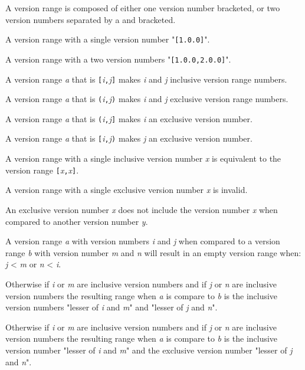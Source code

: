\pnum
A version range is composed of either one version number bracketed,
or two version numbers separated by a   and bracketed.

\begin{example}
A version range with a single version number "\verb|[1.0.0]|".
\end{example}

\begin{example}
A version range with a two version numbers "\verb|[1.0.0,2.0.0]|".
\end{example}

\pnum
A version range \emph{a} that is \verb|[|\emph{i}\verb|,|\emph{j}\verb|]| makes
\emph{i} and \emph{j} inclusive version range numbers.

\pnum
A version range \emph{a} that is \verb|(|\emph{i}\verb|,|\emph{j}\verb|)| makes
\emph{i} and \emph{j} exclusive version range numbers.

\pnum
A version range \emph{a} that is \verb|(|\emph{i}\verb|,|\emph{j}\verb|]| makes
\emph{i} an exclusive version number.

\pnum
A version range \emph{a} that is \verb|[|\emph{i}\verb|,|\emph{j}\verb|)| makes
\emph{j} an exclusive version number.

\pnum
A version range with a single inclusive version number \emph{x} is equivalent
to the version range \verb|[|\emph{x}\verb|,|\emph{x}\verb|]|.

\pnum
A version range with a single exclusive version number \emph{x} is invalid.

\pnum
An exclusive version number \emph{x} does not include the version number
\emph{x} when compared to another version number \emph{y}.

\pnum
A version range \emph{a} with version numbers \emph{i} and \emph{j} when
compared to a version range \emph{b} with version number \emph{m} and \emph{n}
will result in an empty version range when: \emph{j} < \emph{m} or
\emph{n} < \emph{i}.

\pnum
Otherwise if \emph{i} or \emph{m} are inclusive version numbers and if \emph{j}
or \emph{n} are inclusive version numbers the resulting range when \emph{a} is
compare to \emph{b} is the inclusive version numbers "lesser of \emph{i} and
\emph{m}" and "lesser of \emph{j} and \emph{n}".

\pnum
Otherwise if \emph{i} or \emph{m} are inclusive version numbers and if \emph{j}
or \emph{n} are inclusive version numbers the resulting range when \emph{a} is
compare to \emph{b} is the inclusive version number "lesser of \emph{i} and
\emph{m}" and the exclusive version number "lesser of \emph{j} and \emph{n}".

